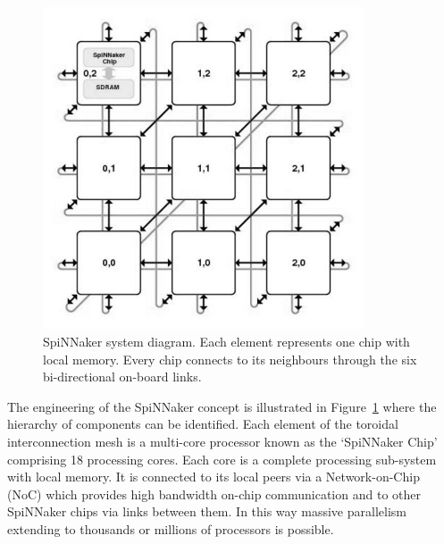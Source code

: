 \begin{figure}[h!]
	\centering
	\includegraphics[width=0.85\textwidth]{pics/mesh_ctiff.jpg}
	\caption{SpiNNaker system diagram.
		Each element represents one chip with local memory.
		Every chip connects to its neighbours through the six bi-directional on-board links. }
	\label{fig:sysdia}
\end{figure}

The engineering of the SpiNNaker concept is illustrated in Figure~\ref{fig:sysdia} where the hierarchy of components can be identified. 
Each element of the toroidal interconnection mesh is a multi-core processor known as the `SpiNNaker Chip' comprising 18 processing cores. 
Each core is a complete processing sub-system with local memory.
It is connected to its local peers via a Network-on-Chip (NoC) which provides high bandwidth on-chip communication and to other SpiNNaker chips via links between them. 
In this way massive parallelism extending to thousands or millions of processors is possible.



%

